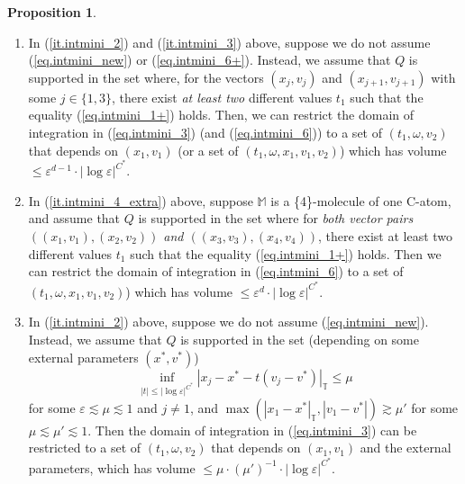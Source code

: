 \documentclass[10pt, reqno]{amsart}
\newcommand{\Mb}{\mathbb M}
\newcommand{\Tb}{\mathbb T}
\theoremstyle{definition}
\newtheorem{proposition}[theorem]{Proposition}
\theoremstyle{remark}
\numberwithin{equation}{section}
\begin{document}
\begin{proposition}
\begin{enumerate}
In addition, assume $Q$ is supported in the set (depending on some external parameters $x^*$)
\begin{equation}\label{eq.intmini_6+}
\min(|x_i-x_j|_\Tb,|v_i-v_j|)\leq\lambda\quad\mathrm{or}\quad \min(|t_1-t^*|,|v_j-v^*|,|x_j-x^*|_\Tb)\leq\lambda
\end{equation}
for some $\varepsilon\lesssim\lambda\lesssim 1$ and $i\neq j$, then in this case, the domain of integration in (\ref{eq.intmini_6}) can be restricted to a set of $(t_1,\omega,x_1,v_1,v_2)$ that depends on the external parameters, which has volume $\leq \lambda\cdot|\log\varepsilon|^{C^*}$.
\item\label{it.intmini_4_extra} In (\ref{it.intmini_2}) and (\ref{it.intmini_3}) above, suppose we do not assume (\ref{eq.intmini_new}) or (\ref{eq.intmini_6+}). Instead, we assume that $Q$ is supported in the set where, for the vectors $(x_j,v_j)$ and $(x_{j+1},v_{j+1})$ with some $j\in\{1,3\}$, there exist \emph{at least two} different values $t_1$ such that the equality (\ref{eq.intmini_1+}) holds. Then, we can restrict the domain of integration in (\ref{eq.intmini_3}) (and (\ref{eq.intmini_6})) to a set of $(t_1,\omega,v_2)$ that depends on $(x_1,v_1)$ (or a set of $(t_1,\omega,x_1,v_1,v_2)$) which has volume $\leq\varepsilon^{d-1}\cdot|\log\varepsilon|^{C^*}$.
\item\label{it.intmini_extra_2} In (\ref{it.intmini_4_extra}) above, suppose $\Mb$ is a \{4\}-molecule of one C-atom, and assume that $Q$ is supported in the set where for \emph{both vector pairs $((x_1,v_1),(x_2,v_2))$ and $((x_3,v_3),(x_4,v_4))$}, there exist at least two different values $t_1$ such that the equality (\ref{eq.intmini_1+}) holds. Then we can restrict the domain of integration in (\ref{eq.intmini_6}) to a set of $(t_1,\omega,x_1,v_1,v_2)$) which has volume $\leq\varepsilon^{d}\cdot|\log\varepsilon|^{C^*}$.
\item\label{it.intmini_extra_3} In (\ref{it.intmini_2}) above, suppose we do not assume (\ref{eq.intmini_new}). Instead, we assume that $Q$ is supported in the set (depending on some external parameters $(x^*,v^*)$)\begin{equation}\label{eq.newprop_3_1}\inf_{|t|\leq |\log\varepsilon|^{C^*}}|x_j-x^*-t(v_j-v^*)|_\Tb\leq\mu\end{equation}
for some $\varepsilon\lesssim\mu\lesssim 1$ and $j\neq 1$, and $\max(|x_1-x^*|_\Tb,|v_1-v^*|)\gtrsim\mu'$ for some $\mu\lesssim\mu'\lesssim 1$. Then the domain of integration in (\ref{eq.intmini_3}) can be restricted to a set of $(t_1,\omega,v_2)$ that depends on $(x_1,v_1)$ and the external parameters, which has volume $\leq \mu\cdot(\mu')^{-1}\cdot|\log\varepsilon|^{C^*}$.
\end{enumerate}
\end{proposition}
\end{document}
